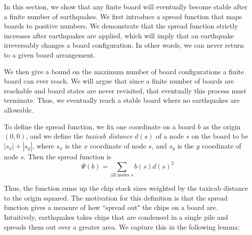 \documentclass[runningheads,a4paper]{llncs}
\begin{document}
In this section, we show that any finite board will eventually become stable after a finite number of earthquakes. We first introduce a spread function that maps boards to positive numbers. We demonstrate that the spread function strictly increases after earthquakes are applied, which will imply that an earthquake irreversably changes a board configuration. In other words, we can never return to a given board arrangement.

We then give a bound on the maximum number of board configurations a finite board can ever reach. We will argue that since a finite number of boards are reachable and board states are never revisited, that eventually this process must terminate. Thus, we eventually reach a stable board where no earthquakes are allowable.

To define the spread function, we fix one coordinate on a board $b$ as the origin $(0,0)$, and we define the \emph{taxicab distance} $d(s)$ of a node $s$ on the board to be $|s_x| + |s_y|$, where $s_x$ is the $x$ coordinate of node $s$, and $s_y$ is the $y$ coordinate of node $s$. Then the spread function is
\begin{equation*}
\Psi(b) = \sum_{\text{all nodes }s}b(s)d(s)^2 
\end{equation*}

Thus, the function sums up the chip stack sizes weighted by the taxicab distance to the origin squared. The motivation for this definition is that the spread function gives a measure of how ``spread out" the chips on a board are. Intuitively, earthquakes takes chips that are condensed in a single pile and spreads them out over a greater area. We capture this in the following lemma:
\end{document}
